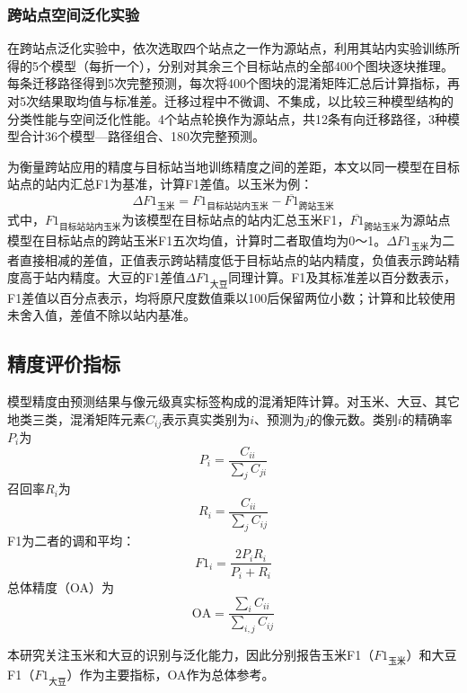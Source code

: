 \subsubsection{跨站点空间泛化实验}

在跨站点泛化实验中，依次选取四个站点之一作为源站点，利用其站内实验训练所得的5个模型（每折一个），分别对其余三个目标站点的全部400个图块逐块推理。每条迁移路径得到5次完整预测，每次将400个图块的混淆矩阵汇总后计算指标，再对5次结果取均值与标准差。迁移过程中不微调、不集成，以比较三种模型结构的分类性能与空间泛化性能。4个站点轮换作为源站点，共12条有向迁移路径，3种模型合计36个模型—路径组合、180次完整预测。

为衡量跨站应用的精度与目标站当地训练精度之间的差距，本文以同一模型在目标站点的站内汇总F1为基准，计算F1差值。以玉米为例：
\begin{equation}
\Delta F1_{\text{玉米}} = F1_{\text{目标站站内玉米}} - \overline{F1}_{\text{跨站玉米}}
\end{equation}
式中，$F1_{\text{目标站站内玉米}}$为该模型在目标站点的站内汇总玉米F1，$\overline{F1}_{\text{跨站玉米}}$为源站点模型在目标站点的跨站玉米F1五次均值，计算时二者取值均为0～1。$\Delta F1_{\text{玉米}}$为二者直接相减的差值，正值表示跨站精度低于目标站点的站内精度，负值表示跨站精度高于站内精度。大豆的F1差值$\Delta F1_{\text{大豆}}$同理计算。F1及其标准差以百分数表示，F1差值以百分点表示，均将原尺度数值乘以100后保留两位小数；计算和比较使用未舍入值，差值不除以站内基准。

\subsection{精度评价指标}

模型精度由预测结果与像元级真实标签构成的混淆矩阵计算。对玉米、大豆、其它地类三类，混淆矩阵元素$C_{ij}$表示真实类别为$i$、预测为$j$的像元数。类别$i$的精确率$P_i$为
\begin{equation}
P_i = \frac{C_{ii}}{\sum_{j} C_{ji}}
\end{equation}
召回率$R_i$为
\begin{equation}
R_i = \frac{C_{ii}}{\sum_{j} C_{ij}}
\end{equation}
F1为二者的调和平均：
\begin{equation}
F1_i = \frac{2 P_i R_i}{P_i + R_i}
\end{equation}
总体精度（OA）为
\begin{equation}
\text{OA} = \frac{\sum_{i} C_{ii}}{\sum_{i,j} C_{ij}}
\end{equation}

本研究关注玉米和大豆的识别与泛化能力，因此分别报告玉米F1（$F1_{\text{玉米}}$）和大豆F1（$F1_{\text{大豆}}$）作为主要指标，OA作为总体参考。

